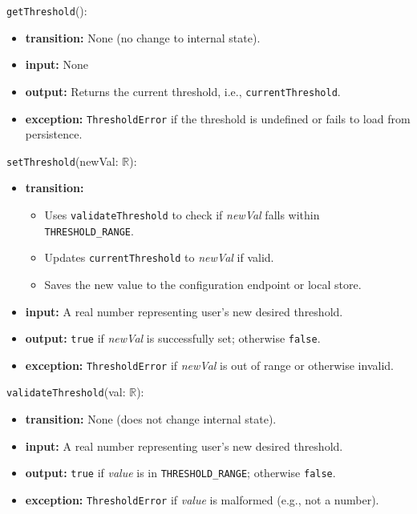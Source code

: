 \documentclass[12pt, titlepage]{article}
\begin{document}
\begin{itemize}
\noindent \texttt{getThreshold}():
\begin{itemize}
    \item \textbf{transition:} None (no change to internal state).
    \item \textbf{input:} None
    \item \textbf{output:} Returns the current threshold, i.e., \texttt{currentThreshold}.
    \item \textbf{exception:} \texttt{ThresholdError} if the threshold is undefined or fails to load from persistence.
\end{itemize}

\noindent \texttt{setThreshold}(newVal: $\mathbb{R}$):
\begin{itemize}
    \item \textbf{transition:}
    \begin{itemize}
        \item Uses \texttt{validateThreshold} to check if \textit{newVal} falls within \texttt{THRESHOLD\_RANGE}.
        \item Updates \texttt{currentThreshold} to \textit{newVal} if valid.
        \item Saves the new value to the configuration endpoint or local store.
    \end{itemize}
    \item \textbf{input:} A real number representing user's new desired threshold.
    \item \textbf{output:} \texttt{true} if \textit{newVal} is successfully set; otherwise \texttt{false}.
    \item \textbf{exception:} \texttt{ThresholdError} if \textit{newVal} is out of range or otherwise invalid.
\end{itemize}

\noindent \texttt{validateThreshold}(val: $\mathbb{R}$):
\begin{itemize}
    \item \textbf{transition:} None (does not change internal state).
    \item \textbf{input:} A real number representing user's new desired threshold.
    \item \textbf{output:} \texttt{true} if \textit{value} is in \texttt{THRESHOLD\_RANGE}; otherwise \texttt{false}.
    \item \textbf{exception:} \texttt{ThresholdError} if \textit{value} is malformed (e.g., not a number).
\end{itemize}


\end{itemize}
\end{document}
